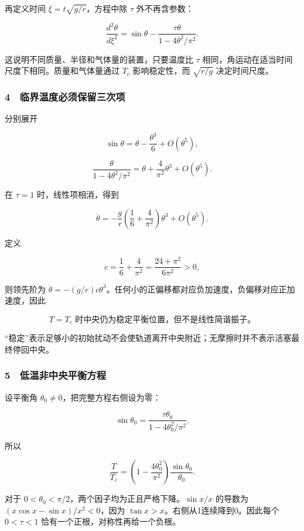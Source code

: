 \documentclass[12pt,a4paper,fontset=fandol]{ctexart}
\begin{document}
再定义时间 \(\xi=t\sqrt{g/r}\)，方程中除 \(\tau\) 外不再含参数：

\[\frac{d^2\theta}{d\xi^2}
=\sin\theta-\frac{\tau\theta}{1-4\theta^2/\pi^2}.\]

这说明不同质量、半径和气体量的装置，只要温度比 \(\tau\)
相同，角运动在适当时间尺度下相同。质量和气体量通过 \(T_c\)
影响稳定性，而 \(\sqrt{r/g}\) 决定时间尺度。

\subsubsection{4　临界温度必须保留三次项}\label{ux4e34ux754cux6e29ux5ea6ux5fc5ux987bux4fddux7559ux4e09ux6b21ux9879}

分别展开

\[\sin\theta=\theta-\frac{\theta^3}{6}+O(\theta^5),\]

\[\frac{\theta}{1-4\theta^2/\pi^2}
=\theta+\frac4{\pi^2}\theta^3+O(\theta^5).\]

在 \(\tau=1\) 时，线性项相消，得到

\[\ddot\theta=-\frac gr
\left(\frac16+\frac4{\pi^2}\right)\theta^3+O(\theta^5).\]

定义

\[c=\frac16+\frac4{\pi^2}=\frac{24+\pi^2}{6\pi^2}>0,\]

则领先阶为
\(\ddot\theta=-(g/r)c\theta^3\)。任何小的正偏移都对应负加速度，负偏移对应正加速度，因此

\[\boxed{T=T_c\text{ 时中央仍为稳定平衡位置，但不是线性简谐振子。}}\]

``稳定''表示足够小的初始扰动不会使轨道离开中央附近；无摩擦时并不表示活塞最终停回中央。

\subsubsection{5　低温非中央平衡方程}\label{ux4f4eux6e29ux975eux4e2dux592eux5e73ux8861ux65b9ux7a0b}

设平衡角 \(\theta_0\ne0\)，把完整方程右侧设为零：

\[\sin\theta_0=\frac{\tau\theta_0}{1-4\theta_0^2/\pi^2}.\]

所以

\[\boxed{\frac T{T_c}
=\left(1-\frac{4\theta_0^2}{\pi^2}\right)
\frac{\sin\theta_0}{\theta_0}.}\]

对于 \(0<\theta_0<\pi/2\)，两个因子均为正且严格下降。\(\sin x/x\)
的导数为 \((x\cos x-\sin x)/x^2<0\)，因为
\(\tan x>x\)。右侧从1连续降到0。因此每个 \(0<\tau<1\)
恰有一个正根，对称性再给一个负根。
\end{document}
